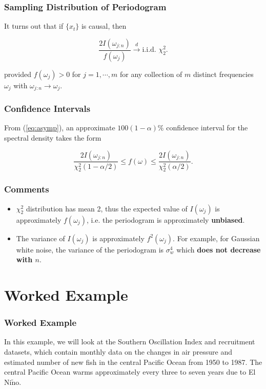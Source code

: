 \documentclass[%
xcolor=pdftex]{beamer}
\begin{document}
\begin{frame}
\frametitle{Sampling Distribution of Periodogram}

It turns out that if $\{ x_t \}$ is causal, then

\begin{equation} \label{eq:asymp}
\frac{2 I(\omega_{j:n})}{f(\omega_j)} \xrightarrow{d} \text{i.i.d. } \chi_2^2.
\end{equation}

provided $f(\omega_j) > 0$ for $j = 1, \cdots, m$ for any collection of $m$ distinct frequencies $\omega_j$ with $\omega_{j:n} \to \omega_j$.

\end{frame}

\begin{frame}
\frametitle{Confidence Intervals}

From (\ref{eq:asymp}), an approximate $100(1-\alpha)\%$ confidence interval for the spectral density takes the form

\begin{equation} \label{eq:CI}
\frac{2 I(\omega_{j:n})}{\chi_2^2(1-\alpha/2)} \leq f(\omega) \leq \frac{2 I(\omega_{j:n})}{\chi_2^2(\alpha/2)}.
\end{equation}

\end{frame}

\begin{frame}
\frametitle{Comments}

\begin{itemize}
\item $\chi_2^2$ distribution has mean 2, thus the expected value of $I(\omega_j)$ is approximately $f(\omega_j)$, i.e. the periodogram is approximately \textbf{unbiased}.
\item The variance of $I(\omega_j)$ is approximately $f^2(\omega_j)$. For example, for Gaussian white noise, the variance of the periodogram is $\sigma_w^4$ which \textbf{does not decrease with $n$}.
\end{itemize}

\end{frame}

\section{Worked Example}
\frame{\tableofcontents[currentsection]}

\begin{frame}
\frametitle{Worked Example}

In this example, we will look at the Southern Oscillation Index and recruitment datasets, which contain monthly data on the changes in air pressure and estimated number of new fish in the central Pacific Ocean from 1950 to 1987. The central Pacific Ocean warms approximately every three to seven years due to El Ni$\tilde{\text{n}}$o.

\end{frame}
\end{document}
